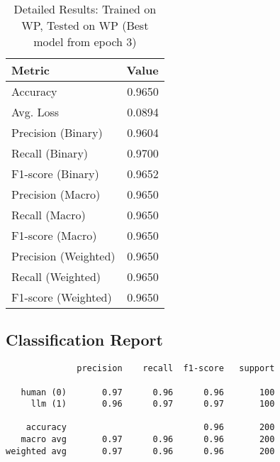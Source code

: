 \documentclass{article}
\begin{document}
\begin{table}[htbp]
\centering
\caption*{Detailed Results: Trained on WP, Tested on WP (Best model from epoch 3)}
\begin{tabular}{@{}lr@{}}
\toprule
Metric & Value \\
\midrule
Accuracy & 0.9650 \\
Avg. Loss & 0.0894 \\
Precision (Binary) & 0.9604 \\
Recall (Binary) & 0.9700 \\
F1-score (Binary) & 0.9652 \\
Precision (Macro) & 0.9650 \\
Recall (Macro) & 0.9650 \\
F1-score (Macro) & 0.9650 \\
Precision (Weighted) & 0.9650 \\
Recall (Weighted) & 0.9650 \\
F1-score (Weighted) & 0.9650 \\
\bottomrule
\end{tabular}
\subsection*{Classification Report}
\begin{verbatim}
              precision    recall  f1-score   support

   human (0)       0.97      0.96      0.96       100
     llm (1)       0.96      0.97      0.97       100

    accuracy                           0.96       200
   macro avg       0.97      0.96      0.96       200
weighted avg       0.97      0.96      0.96       200
\end{verbatim}
\end{table}
\end{document}
